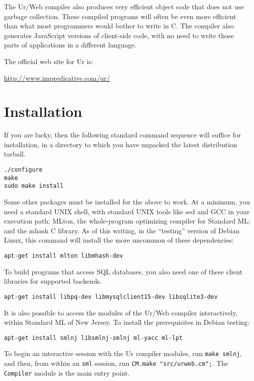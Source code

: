 \documentclass{article}
\begin{document}
The Ur/Web compiler also produces very efficient object code that does not use garbage collection.  These compiled programs will often be even more efficient than what most programmers would bother to write in C.  The compiler also generates JavaScript versions of client-side code, with no need to write those parts of applications in a different language.

\medskip

The official web site for Ur is:
\begin{center}
  \url{http://www.impredicative.com/ur/}
\end{center}


\section{Installation}

If you are lucky, then the following standard command sequence will suffice for installation, in a directory to which you have unpacked the latest distribution tarball.

\begin{verbatim}
./configure
make
sudo make install
\end{verbatim}

Some other packages must be installed for the above to work.  At a minimum, you need a standard UNIX shell, with standard UNIX tools like sed and GCC in your execution path; MLton, the whole-program optimizing compiler for Standard ML; and the mhash C library.  As of this writing, in the ``testing'' version of Debian Linux, this command will install the more uncommon of these dependencies:
\begin{verbatim}
apt-get install mlton libmhash-dev
\end{verbatim}

To build programs that access SQL databases, you also need one of these client libraries for supported backends.
\begin{verbatim}
apt-get install libpq-dev libmysqlclient15-dev libsqlite3-dev
\end{verbatim}

It is also possible to access the modules of the Ur/Web compiler interactively, within Standard ML of New Jersey.  To install the prerequisites in Debian testing:
\begin{verbatim}
apt-get install smlnj libsmlnj-smlnj ml-yacc ml-lpt
\end{verbatim}

To begin an interactive session with the Ur compiler modules, run \texttt{make smlnj}, and then, from within an \texttt{sml} session, run \texttt{CM.make "src/urweb.cm";}.  The \texttt{Compiler} module is the main entry point.
\end{document}
